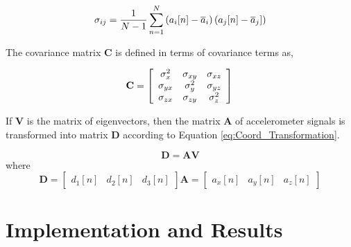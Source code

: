 \documentclass[12pt,a4paper,oneside]{book}
\begin{document}
\begin{equation}
\sigma_{ij} = \frac{1}{N-1} \sum_{n=1}^{N}{\left(a_{i}[n]-\overline{a}_i\right)\left(a_j[n]-\overline{a}_j]\right)} \\
\label{eq:Covariance}
\end{equation}

The covariance matrix $\mathbf{C}$ is defined in terms of covariance terms as,

\begin{equation}
\mathbf{C} = \left[\begin{array}{ccc}
              \sigma_x^2 & \sigma_{xy} & \sigma_{xz} \\
              \sigma_{yx} & \sigma_y^2 & \sigma_{yz} \\
              \sigma_{zx} & \sigma_{zy} & \sigma_z^2
              \end{array} \right] \\
\label{eq:Covariance_Matrix}
\end{equation}

If $\mathbf{V}$ is the matrix of eigenvectors, then the matrix $\mathbf{A}$ of accelerometer signals is transformed into matrix $\mathbf{D}$ according to Equation \ref{eq:Coord_Transformation}.


\begin{equation}
\mathbf{D} = \mathbf{A} \mathbf{V}
\label{eq:Coord_Transformation}
\end{equation}
%
where
%
\begin{equation}
\mathbf{D} = \left[\begin{array}{ccc}d_1[n] & d_2[n] & d_3[n] \end{array}\right]
\mathbf{A} = \left[  \begin{array}{ccc}a_x[n] & a_y[n] & a_z[n]\end{array} \right]
\end{equation}


\chapter{Implementation and Results}
\label{ch:Implementation_and_Results}
\end{document}
